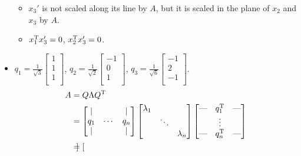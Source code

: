 \documentclass{article}
\begin{document}
\begin{itemize}
\begin{itemize}
        \item $x_3'$ is not scaled along its line by $A$, but it is scaled in the plane of $x_2$ and $x_3$ by $A$.
        \item $x_1^{\text{T}} x_3' = 0$, $x_2^{\text{T}} x_3' = 0$.
    \end{itemize}
    \item $
        q_1 = \frac{1}{\sqrt{3}}
        \begin{bmatrix}
            1\\
            1\\
            1\\
        \end{bmatrix}
    $, $
        q_2 = \frac{1}{\sqrt{2}}
        \begin{bmatrix}
            -1\\
            0\\
            1\\
        \end{bmatrix}
    $, $
        q_3 = \frac{1}{\sqrt{6}}
        \begin{bmatrix}
            -1\\
            2\\
            -1\\
        \end{bmatrix}
    $.
    \begin{align*}
        A &= Q\Lambda Q^{\text{T}}\\
        &=
        \begin{bmatrix}
            | &  & |\\
            q_1 & \cdots & q_n\\
            | &  & |\\
        \end{bmatrix}
        \begin{bmatrix}
            \lambda_1 &  & \\
             & \ddots & \\
             &  & \lambda_n\\
        \end{bmatrix}
        \begin{bmatrix}
            \text{---} & q_1^{\text{T}} & \text{---}\\
             & \vdots & \\
            \text{---} & q_n^{\text{T}} & \text{---}\\
        \end{bmatrix}\\
        &=
        \begin{bmatrix}

\end{bmatrix}
\end{align*}
\end{itemize}
\end{document}
